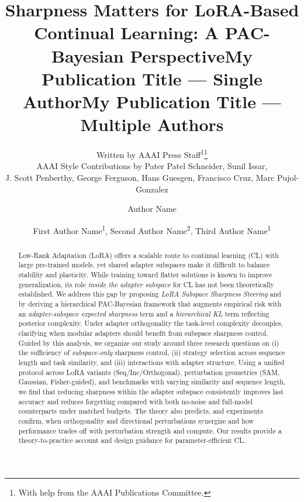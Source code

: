 \documentclass[letterpaper]{article} %
\title{Sharpness Matters for LoRA-Based Continual Learning: A PAC-Bayesian Perspective}
\author{
    Written by AAAI Press Staff\textsuperscript{\rm 1}\thanks{With help from the AAAI Publications Committee.}\\
    AAAI Style Contributions by Pater Patel Schneider,
    Sunil Issar,\\
    J. Scott Penberthy,
    George Ferguson,
    Hans Guesgen,
    Francisco Cruz\equalcontrib,
    Marc Pujol-Gonzalez\equalcontrib
}
\title{My Publication Title --- Single Author}
\author {
    Author Name
}
\title{My Publication Title --- Multiple Authors}
\author {
    First Author Name\textsuperscript{\rm 1},
    Second Author Name\textsuperscript{\rm 2},
    Third Author Name\textsuperscript{\rm 1}
}
\begin{document}
\maketitle

\begin{abstract}

Low-Rank Adaptation (LoRA) offers a scalable route to continual learning (CL) with large pre-trained models, yet shared adapter subspaces make it difficult to balance stability and plasticity. While training toward flatter solutions is known to improve generalization, its role \emph{inside the adapter subspace} for CL has not been theoretically established. We address this gap by proposing \emph{LoRA Subspace Sharpness Steering} and by deriving a hierarchical PAC-Bayesian framework that augments empirical risk with an \emph{adapter-subspace expected sharpness} term and a \emph{hierarchical KL} term reflecting posterior complexity. Under adapter orthogonality the task-level complexity decouples, clarifying when modular adapters should benefit from subspace sharpness control. Guided by this analysis, we organize our study around three research questions on (i) the sufficiency of \emph{subspace-only} sharpness control, (ii) strategy selection across sequence length and task similarity, and (iii) interactions with adapter structure. Using a unified protocol across LoRA variants (Seq/Inc/Orthogonal), perturbation geometries (SAM, Gaussian, Fisher-guided), and benchmarks with varying similarity and sequence length, we find that reducing sharpness within the adapter subspace consistently improves last accuracy and reduces forgetting compared with both no-noise and full-model counterparts under matched budgets. The theory also predicts, and experiments confirm, when orthogonality and directional perturbations synergize and how performance trades off with perturbation strength and compute. Our results provide a theory-to-practice account and design guidance for parameter-efficient CL.
\end{abstract}
\end{document}
